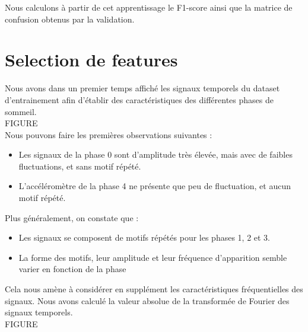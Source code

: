 \documentclass{article}
\begin{document}
Nous calculons à partir de cet apprentissage le F1-score ainsi que la matrice de confusion obtenus par la validation.

\section{Selection de features}

Nous avons dans un premier temps affiché les signaux temporels du dataset d'entrainement afin d'établir des caractéristiques des différentes phases de sommeil.
\\

FIGURE
\\

Nous pouvons faire les premières observations suivantes :
\\

\begin{itemize}
\item Les signaux de la phase 0 sont d'amplitude très élevée, mais avec de faibles fluctuations, et sans motif répété.
\item L'accéléromètre de la phase 4 ne présente que peu de fluctuation, et aucun motif répété.
\end{itemize}
\vspace{0.5cm}

Plus généralement, on constate que :
\\

\begin{itemize}
\item Les signaux se composent de motifs répétés pour les phases 1, 2 et 3.
\item La forme des motifs, leur amplitude et leur fréquence d'apparition semble varier en fonction de la phase
\end{itemize}
\vspace{0.5cm}

Cela nous amène à considérer en supplément les caractéristiques fréquentielles des signaux. Nous avons calculé la valeur absolue de la transformée de Fourier des signaux temporels.
\\

FIGURE
\\
\end{document}
